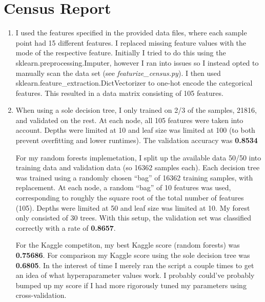 \documentclass{article}
\begin{document}
\section*{Census Report}
\begin{enumerate}
  \item I used the features specified in the provided data files, where each sample point had 15 different features. I replaced missing feature values with the mode of the respective feature. Initially I tried to do this using the sklearn.preprocessing.Imputer, however I ran into issues so I instead opted to manually scan the data set (see \textit{featurize\_census.py}). I then used sklearn.feature\_extraction.DictVectorizer to one-hot encode the categorical features. This resulted in a data matrix consisting of 105 features.
  
  \item When using a sole decision tree, I only trained on 2/3 of the samples, 21816, and validated on the rest. At each node, all 105 features were taken into account. Depths were limited at 10 and leaf size was limited at 100 (to both prevent overfitting and lower runtimes). The validation accuracy was \textbf{0.8534}

    For my random forests implemetation, I split up the available data 50/50 into training data and validation data (so 16362 samples each). Each decision tree was trained using a randomly chosen ``bag'' of 16362 training samples, with replacement. At each node, a random ``bag'' of 10 features was used, corresponding to roughly the square root of the total number of features (105). Depths were limited at 50 and leaf size was limited at 10. My forest only consisted of 30 trees. With this setup, the validation set was classified correctly with a rate of \textbf{0.8657}.
    
    For the Kaggle competiton, my best Kaggle score (random forests) was \textbf{0.75686}. For comparison my Kaggle score using the sole decision tree was \textbf{0.6805}. In the interest of time I merely ran the script a couple times to get an idea of what hyperaparameter values work. I probably could've probably bumped up my score if I had more rigorously tuned my parameters using cross-validation.
    

\end{enumerate}
\end{document}
